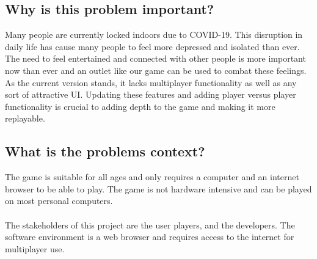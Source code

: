 \documentclass{article}
\begin{document}
\subsection{Why is this problem important?}

Many people are currently locked indoors due to COVID-19. This disruption in daily life has cause many people to feel more depressed and isolated than ever. The need to feel entertained and connected with other people is more important now than ever and an outlet like our game can be used to combat these feelings. As the current version stands, it lacks multiplayer functionality as well as any sort of attractive UI. Updating these features and adding player versus player functionality is crucial to adding depth to the game and making it more replayable.  

\subsection{What is the problems context?}

The game is suitable for all ages and only requires a computer and an internet browser to be able to play. The game is not hardware intensive and can be played on most personal computers.  
\\
\\
The stakeholders of this project are the user players, and the developers. The software environment is a web browser and requires access to the internet for multiplayer use.
\end{document}
